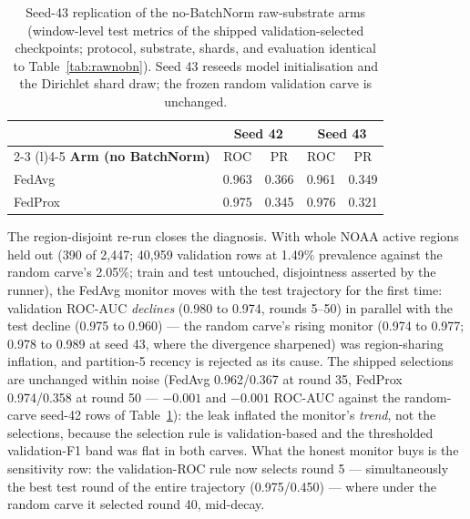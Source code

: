 \begin{table}[t]
\centering
\caption{Seed-43 replication of the no-BatchNorm raw-substrate arms
(window-level test metrics of the shipped validation-selected
checkpoints; protocol, substrate, shards, and evaluation identical
to Table~\ref{tab:rawnobn}). Seed 43 reseeds model initialisation
and the Dirichlet shard draw; the frozen random validation carve is
unchanged.}
\label{tab:rawnobnrep}
\small
\begin{tabular}{@{}l cc cc@{}}
\toprule
 & \multicolumn{2}{c}{\textbf{Seed 42}} &
 \multicolumn{2}{c}{\textbf{Seed 43}} \\
\cmidrule(r){2-3} \cmidrule(l){4-5}
\textbf{Arm (no BatchNorm)} & ROC & PR & ROC & PR \\
\midrule
FedAvg & 0.963 & 0.366 & 0.961 & 0.349 \\
FedProx & 0.975 & 0.345 & 0.976 & 0.321 \\
\bottomrule
\end{tabular}
\end{table}

The region-disjoint re-run closes the diagnosis. With whole NOAA
active regions held out (390 of 2{,}447; 40{,}959 validation rows
at 1.49\% prevalence against the random carve's 2.05\%; train and
test untouched, disjointness asserted by the runner), the FedAvg
monitor moves with the test trajectory for the first time:
validation ROC-AUC \emph{declines} (0.980 to 0.974, rounds 5--50)
in parallel with the test decline (0.975 to 0.960) --- the random
carve's rising monitor (0.974 to 0.977; 0.978 to 0.989 at seed 43,
where the divergence sharpened) was region-sharing inflation, and
partition-5 recency is rejected as its cause. The shipped
selections are unchanged within noise (FedAvg 0.962/0.367 at
round 35, FedProx 0.974/0.358 at round 50 --- $-0.001$ and
$-0.001$ ROC-AUC against the random-carve seed-42 rows of
Table~\ref{tab:rawnobnrep}): the leak inflated the monitor's
\emph{trend}, not the selections, because the selection rule is
validation-based and the thresholded validation-F1 band was flat
in both carves. What the honest monitor buys is the sensitivity
row: the validation-ROC rule now selects round 5 --- simultaneously
the best test round of the entire trajectory (0.975/0.450) ---
where under the random carve it selected round 40, mid-decay.

